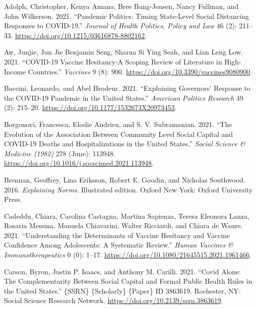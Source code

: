 \documentclass[
]{article}
\newlength{\cslhangindent}
\newlength{\cslentryspacingunit} %
\newenvironment{CSLReferences}[2] %
 {%
  \setlength{\parindent}{0pt}
  \ifodd #1
  \let\oldpar\par
  \def\par{\hangindent=\cslhangindent\oldpar}
  \fi
  \setlength{\parskip}{#2\cslentryspacingunit}
 }%
 {}
\begin{document}
\hypertarget{refs}{}
\begin{CSLReferences}{1}{0}
\leavevmode{}%
Adolph, Christopher, Kenya Amano, Bree Bang-Jensen, Nancy Fullman, and
John Wilkerson. 2021. {``Pandemic {Politics}: {Timing} {State}-{Level}
{Social} {Distancing} {Responses} to {COVID}-19.''} \emph{Journal of
Health Politics, Policy and Law} 46 (2): 211--33.
\url{https://doi.org/10.1215/03616878-8802162}.

\leavevmode{}%
Aw, Junjie, Jun Jie Benjamin Seng, Sharna Si Ying Seah, and Lian Leng
Low. 2021. {``{COVID}-19 {Vaccine} {Hesitancy}-{A} {Scoping} {Review} of
{Literature} in {High}-{Income} {Countries}.''} \emph{Vaccines} 9 (8):
900. \url{https://doi.org/10.3390/vaccines9080900}.

\leavevmode{}%
Baccini, Leonardo, and Abel Brodeur. 2021. {``Explaining {Governors}'
{Response} to the {COVID}-19 {Pandemic} in the {United} {States}.''}
\emph{American Politics Research} 49 (2): 215--20.
\url{https://doi.org/10.1177/1532673X20973453}.

\leavevmode{}%
Borgonovi, Francesca, Elodie Andrieu, and S. V. Subramanian. 2021.
{``The Evolution of the Association Between Community Level Social
Capital and {COVID}-19 Deaths and Hospitalizations in the {United}
{States}.''} \emph{Social Science \& Medicine (1982)} 278 (June):
113948. \url{https://doi.org/10.1016/j.socscimed.2021.113948}.

\leavevmode{}%
Brennan, Geoffrey, Lina Eriksson, Robert E. Goodin, and Nicholas
Southwood. 2016. \emph{Explaining {Norms}}. Illustrated edition. Oxford
New York: Oxford University Press.

\leavevmode{}%
Cadeddu, Chiara, Carolina Castagna, Martina Sapienza, Teresa Eleonora
Lanza, Rosaria Messina, Manuela Chiavarini, Walter Ricciardi, and Chiara
de Waure. 2021. {``Understanding the Determinants of Vaccine Hesitancy
and Vaccine Confidence Among Adolescents: A Systematic Review.''}
\emph{Human Vaccines \& Immunotherapeutics} 0 (0): 1--17.
\url{https://doi.org/10.1080/21645515.2021.1961466}.

\leavevmode{}%
Carson, Byron, Justin P. Isaacs, and Anthony M. Carilli. 2021. {``Covid
{Alone}: {The} {Complementarity} {Between} {Social} {Capital} and
{Formal} {Public} {Health} {Rules} in the {United} {States}.''} \{SSRN\}
\{Scholarly\} \{Paper\} ID 3863619. Rochester, NY: Social Science
Research Network. \url{https://doi.org/10.2139/ssrn.3863619}.


\end{CSLReferences}
\end{document}

